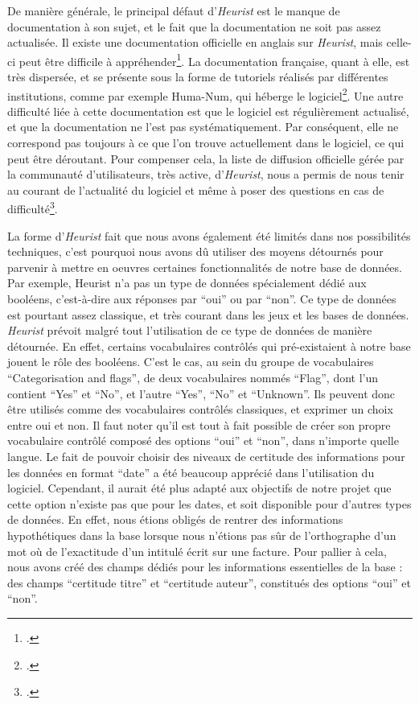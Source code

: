 De manière générale, le principal défaut d'\emph{Heurist} est le manque de documentation à son sujet, et le fait que la documentation ne soit pas assez actualisée. Il existe une documentation officielle en anglais sur \emph{Heurist}, mais celle-ci peut être difficile à appréhender\footcite{heurist_help}. La documentation française, quant à elle, est très dispersée, et se présente sous la forme de tutoriels réalisés par différentes institutions, comme par exemple Huma-Num, qui héberge le logiciel\footcite{huma-num_heurist_2026}. Une autre difficulté liée à cette documentation est que le logiciel est régulièrement actualisé, et que la documentation ne l'est pas systématiquement. Par conséquent, elle ne correspond pas toujours à ce que l'on trouve actuellement dans le logiciel, ce qui peut être déroutant. Pour compenser cela, la liste de diffusion officielle gérée par la communauté d'utilisateurs, très active, d'\emph{Heurist}, nous a permis de nous tenir au courant de l'actualité du logiciel et même à poser des questions en cas de difficulté\footcite{noauthor_heurist-utilisateurs_nodate}. 

La forme d'\emph{Heurist} fait que nous avons également été limités dans nos possibilités techniques, c'est pourquoi nous avons dû utiliser des moyens détournés pour parvenir à mettre en oeuvres certaines fonctionnalités de notre base de données. Par exemple, Heurist n'a pas un type de données spécialement dédié aux booléens, c'est-à-dire aux réponses par \enquote{oui} ou par \enquote{non}. Ce type de données est pourtant assez classique, et très courant dans les jeux et les bases de données. \emph{Heurist} prévoit malgré tout l'utilisation de ce type de données de manière détournée. En effet, certains vocabulaires contrôlés qui pré-existaient à notre base jouent le rôle des booléens. C'est le cas, au sein du groupe de vocabulaires \enquote{Categorisation and flags}, de deux vocabulaires nommés \enquote{Flag}, dont l'un contient \enquote{Yes} et \enquote{No}, et l'autre \enquote{Yes}, \enquote{No} et \enquote{Unknown}. Ils peuvent donc être utilisés comme des vocabulaires contrôlés classiques, et exprimer un choix entre oui et non. Il faut noter qu'il est tout à fait possible de créer son propre vocabulaire contrôlé composé des options \enquote{oui} et \enquote{non}, dans n'importe quelle langue. 
Le fait de pouvoir choisir des niveaux de certitude des informations pour les données en format \enquote{date} a été beaucoup apprécié dans l'utilisation du logiciel. Cependant, il aurait été plus adapté aux objectifs de notre projet que cette option n'existe pas que pour les dates, et soit disponible pour d'autres types de données. En effet, nous étions obligés de rentrer des informations hypothétiques dans la base lorsque nous n'étions pas sûr de l'orthographe d'un mot où de l'exactitude d'un intitulé écrit sur une facture. Pour pallier à cela, nous avons créé des champs dédiés pour les informations essentielles de la base : des champs \enquote{certitude titre} et \enquote{certitude auteur}, constitués des options \enquote{oui} et \enquote{non}. 

